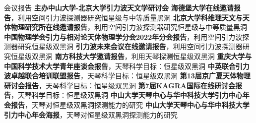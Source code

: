 
\begin{rubric}{会议报告}
    \entry*[2023] \textbf{主办中山大学-北京大学引力波天文学研讨会}
    \entry*[2023] \textbf{海德堡大学在线邀请报告}，利用空间引力波探测器研究恒星级与中等质量黑洞
    \entry*[2023] \textbf{北京大学科维理天文与天体物理研究所在线邀请报告}，利用空间引力波探测器研究恒星级与中等质量黑洞
    \entry*[2022] \textbf{中国物理学会引力与相对论天体物理学分会2022年分会报告}，利用空间引力波探测器研究恒星级双黑洞
    \entry*[2022] \textbf{引力波未来会议在线邀请报告}，利用空间引力波探测器研究恒星级双黑洞
    \entry*[2022] \textbf{南方科技大学邀请报告}，利用天琴探测恒星级双黑洞 
    \entry*[2021] \textbf{重庆大学与中国科学技术大学青年座谈会报告}，天琴科学目标：恒星级双黑洞
    \entry*[2021] \textbf{中英联合引力波卓越联合培训联盟报告}，天琴科学目标：恒星级双黑洞
    \entry*[2020] \textbf{第13届京广夏天体物理研讨会报告}，天琴科学目标：恒星级双黑洞
    \entry*[2020] \textbf{第7届KAGRA国际在线研讨会报告}，天琴科学目标：恒星级双黑洞
    \entry*[2019] \textbf{中山大学天琴中心与华中科技大学引力中心年会报告}，天琴对恒星级双黑洞探测能力的研究 
    \entry*[2018] \textbf{中山大学天琴中心与华中科技大学引力中心年会海报}，天琴对恒星级双黑洞探测能力的研究
\end{rubric}
